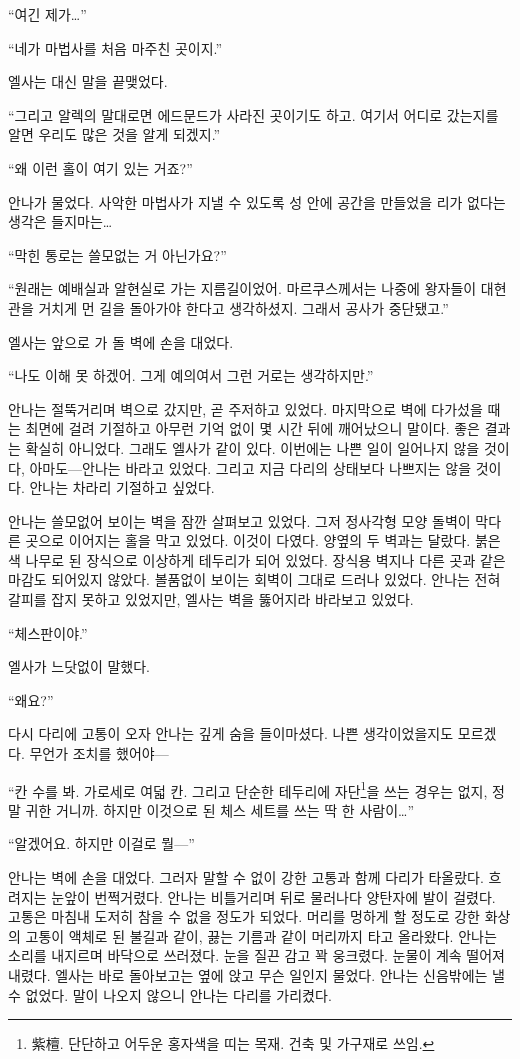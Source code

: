 ``여긴 제가\ldots''

``네가 마법사를 처음 마주친 곳이지.''

엘사는 대신 말을 끝맺었다.

``그리고 알렉의 말대로면 에드문드가 사라진 곳이기도 하고. 여기서 어디로 갔는지를 알면 우리도 많은 것을 알게 되겠지.''

``왜 이런 홀이 여기 있는 거죠?''

안나가 물었다. 사악한 마법사가 지낼 수 있도록 성 안에 공간을 만들었을 리가 없다는 생각은 들지마는\ldots

``막힌 통로는 쓸모없는 거 아닌가요?''

``원래는 예배실과 알현실로 가는 지름길이었어. 마르쿠스께서는 나중에 왕자들이 대현관을 거치게 먼 길을 돌아가야 한다고 생각하셨지. 그래서 공사가 중단됐고.''

엘사는 앞으로 가 돌 벽에 손을 대었다.

``나도 이해 못 하겠어. 그게 예의여서 그런 거로는 생각하지만.''

안나는 절뚝거리며 벽으로 갔지만, 곧 주저하고 있었다. 마지막으로 벽에 다가섰을 때는 최면에 걸려 기절하고 아무런 기억 없이 몇 시간 뒤에 깨어났으니 말이다. 좋은 결과는 확실히 아니었다. 그래도 엘사가 같이 있다. 이번에는 나쁜 일이 일어나지 않을 것이다, 아마도—안나는 바라고 있었다. 그리고 지금 다리의 상태보다 나쁘지는 않을 것이다. 안나는 차라리 기절하고 싶었다.

안나는 쓸모없어 보이는 벽을 잠깐 살펴보고 있었다. 그저 정사각형 모양 돌벽이 막다른 곳으로 이어지는 홀을 막고 있었다. 이것이 다였다. 양옆의 두 벽과는 달랐다. 붉은색 나무로 된 장식으로 이상하게 테두리가 되어 있었다. 장식용 벽지나 다른 곳과 같은 마감도 되어있지 않았다. 볼품없이 보이는 회벽이 그대로 드러나 있었다. 안나는 전혀 갈피를 잡지 못하고 있었지만, 엘사는 벽을 뚫어지라 바라보고 있었다.

``체스판이야.''

엘사가 느닷없이 말했다.

``왜요?''

다시 다리에 고통이 오자 안나는 깊게 숨을 들이마셨다. 나쁜 생각이었을지도 모르겠다. 무언가 조치를 했어야—

``칸 수를 봐. 가로세로 여덟 칸. 그리고 단순한 테두리에 자단\footnote{紫檀. 단단하고 어두운 홍자색을 띠는 목재. 건축 및 가구재로 쓰임.}을 쓰는 경우는 없지, 정말 귀한 거니까. 하지만 이것으로 된 체스 세트를 쓰는 딱 한 사람이\ldots''

``알겠어요. 하지만 이걸로 뭘—''

안나는 벽에 손을 대었다. 그러자 말할 수 없이 강한 고통과 함께 다리가 타올랐다. 흐려지는 눈앞이 번쩍거렸다. 안나는 비틀거리며 뒤로 물러나다 양탄자에 발이 걸렸다. 고통은 마침내 도저히 참을 수 없을 정도가 되었다. 머리를 멍하게 할 정도로 강한 화상의 고통이 액체로 된 불길과 같이, 끓는 기름과 같이 머리까지 타고 올라왔다. 안나는 소리를 내지르며 바닥으로 쓰러졌다. 눈을 질끈 감고 꽉 웅크렸다. 눈물이 계속 떨어져 내렸다. 엘사는 바로 돌아보고는 옆에 앉고 무슨 일인지 물었다. 안나는 신음밖에는 낼 수 없었다. 말이 나오지 않으니 안나는 다리를 가리켰다.

